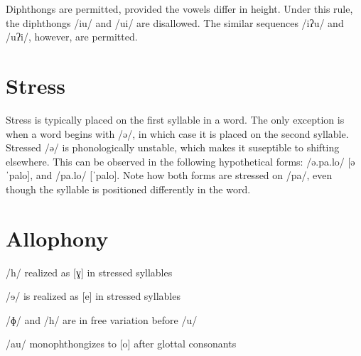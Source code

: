 Diphthongs are permitted, provided the vowels differ in height. Under this rule, the diphthongs /iu/ and /ui/ are disallowed. The similar sequences /iʔu/ and /uʔi/, however, are permitted.

\section{Stress}
Stress is typically placed on the first syllable in a word. The only exception is when a word begins with /ə/, in which case it is placed on the second syllable. Stressed /ə/ is phonologically unstable, which makes it suseptible to shifting elsewhere. This can be observed in the following hypothetical forms: /ə.pa.lo/ [əˈpalo], and /pa.lo/ [ˈpalo]. Note how both forms are stressed on /pa/, even though the syllable is positioned differently in the word.

\section{Allophony}


/h/ realized as [ɣ] in stressed syllables


/ɘ/ is realized as [e] in stressed syllables


/ɸ/ and /h/ are in free variation before /u/

/au/ monophthongizes to [o] after glottal consonants

